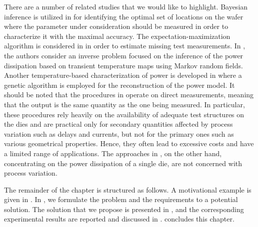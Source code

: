 There are a number of related studies that we would like to highlight. Bayesian
inference is utilized in \cite{zhang2010} for identifying the optimal set of
locations on the wafer where the parameter under consideration should be
measured in order to characterize it with the maximal accuracy. The
expectation-maximization algorithm is considered in \cite{reda2009} in order to
estimate missing test measurements. In \cite{paek2012}, the authors consider an
inverse problem focused on the inference of the power dissipation based on
transient temperature maps using Markov random fields. Another temperature-based
characterization of power is developed in \cite{mesa-martinez2007} where a
genetic algorithm is employed for the reconstruction of the power model. It
should be noted that the procedures in \cite{zhang2010, reda2009} operate on
direct measurements, meaning that the output is the same quantity as the one
being measured. In particular, these procedures rely heavily on the availability
of adequate test structures on the dies and are practical only for secondary
quantities affected by process variation such as delays and currents, but not
for the primary ones such as various geometrical properties. Hence, they often
lead to excessive costs and have a limited range of applications. The approaches
in \cite{paek2012, mesa-martinez2007}, on the other hand, concentrating on the
power dissipation of a single die, are not concerned with process variation.

The remainder of the chapter is structured as follows. A motivational example is
given in . In , we formulate the
problem and the requirements to a potential solution. The solution that we
propose is presented in , and the corresponding
experimental results are reported and discussed in .
 concludes this chapter.

